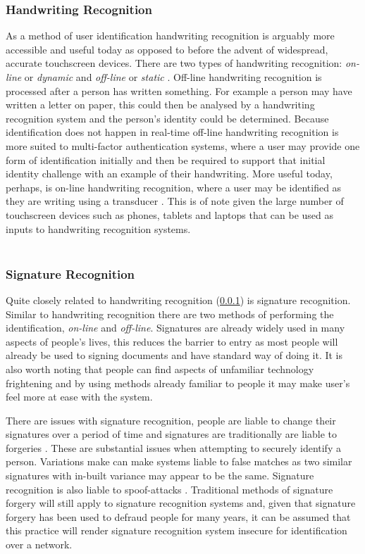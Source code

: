 \documentclass[12pt]{article}
\begin{document}
	\subsubsection{Handwriting Recognition}
	\label{subsubsect:handwriting_recognition}
	As a method of user identification handwriting recognition is arguably more accessible and useful today as opposed to before the advent of widespread, accurate touchscreen devices. There are two types of handwriting recognition: \emph{on-line} or \emph{dynamic} and \emph{off-line} or \emph{static} \citep{tappert_handwriting}. Off-line handwriting recognition is processed after a person has written something. For example a person may have written a letter on paper, this could then be analysed by a handwriting recognition system and the person's identity could be determined. Because identification does not happen in real-time off-line handwriting recognition is more suited to multi-factor authentication systems, where a user may provide one form of identification initially and then be required to support that initial identity challenge with an example of their handwriting. More useful today, perhaps, is on-line handwriting recognition, where a user may be identified as they are writing using a transducer \citep{tappert_handwriting}. This is of note given the large number of touchscreen devices such as phones, tablets and laptops that can be used as inputs to handwriting recognition systems.
	\\
	\\
	\subsubsection{Signature Recognition}
	\label{subsubsect:signature_recognition}
	Quite closely related to handwriting recognition (\ref{subsubsect:handwriting_recognition}) is signature recognition. Similar to handwriting recognition there are two methods of performing the identification, \emph{on-line} and \emph{off-line}. Signatures are already widely used in many aspects of people's lives, this reduces the barrier to entry as most people will already be used to signing documents and have standard way of doing it. It is also worth noting that people can find aspects of unfamiliar technology frightening and by using methods already familiar to people it may make user's feel more at ease with the system.
	
	There are issues with signature recognition, people are liable to change their signatures over a period of time and signatures are traditionally are liable to forgeries \citep{jain2004introduction}. These are substantial issues when attempting to securely identify a person. Variations make can make systems liable to false matches as two similar signatures with in-built variance may appear to be the same. Signature recognition is also liable to spoof-attacks \citep{jain2004introduction}. Traditional methods of signature forgery will still apply to signature recognition systems and, given that signature forgery has been used to defraud people for many years, it can be assumed that this practice will render signature recognition system insecure for identification over a network.
	\\
	\\
\end{document}
